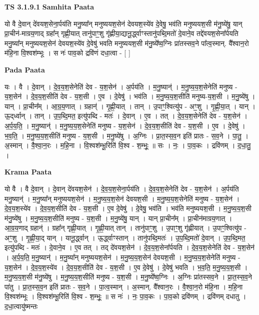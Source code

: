 \documentclass[17pt]{extarticle}
\begin{document}
\textbf{TS 3.1.9.1 } \newline
\textbf{Samhita Paata} \newline

यो वै दे॒वान् दे॑वयश॒सेना॒र्पय॑ति मनु॒ष्या᳚न् मनुष्ययश॒सेन॑ देवयश॒स्ये॑व दे॒वेषु॒ भव॑ति मनुष्ययश॒सी म॑नु॒ष्ये॑षु॒ यान् प्रा॒चीन॑-माग्रय॒णाद् ग्रहा᳚न् गृह्णी॒यात् तानु॑पाꣳ॒॒शु गृ॑ह्णीया॒द्यानू॒र्द्ध्वाꣳस्तानु॑पब्दि॒मतो॑ दे॒वाने॒व तद्दे॑वयश॒सेना᳚र्पयति मनु॒ष्या᳚न् मनुष्ययश॒सेन॑ देवयश॒स्ये॑व दे॒वेषु॑ भवति मनुष्ययश॒सी म॑नु॒ष्ये᳚ष्व॒ग्निः प्रा॑तस्सव॒ने पा᳚त्व॒स्मान्. वै᳚श्वान॒रो म॑हि॒ना वि॒श्वश॑म्भूः । स नः॑ पाव॒को द्रवि॑णं दधा॒त्वा - [  ] \newline

\textbf{Pada Paata} \newline

यः । वै । दे॒वान् । दे॒व॒य॒श॒सेनेति॑ देव - य॒श॒सेन॑ । अ॒र्पय॑ति । म॒नु॒ष्यान्॑ । म॒नु॒ष्य॒य॒श॒सेनेति॑ मनुष्य - य॒श॒सेन॑ । दे॒व॒य॒श॒सीति॑ देव - य॒श॒सी । ए॒व । दे॒वेषु॑ । भव॑ति । म॒नु॒ष्य॒य॒श॒सीति॑ मनुष्य-य॒श॒सी । म॒नु॒ष्ये॑षु । यान् । प्रा॒चीन᳚म् । आ॒ग्र॒य॒णात् । ग्रहान्॑ । गृ॒ह्णी॒यात् । तान् । उ॒पाꣳ॒॒श्वित्यु॑प - अꣳ॒॒शु । गृ॒ह्णी॒या॒त् । यान् । ऊ॒द्‌र्ध्वान् । तान् । उ॒प॒ब्दि॒मत॒ इत्यु॑पब्दि - मतः॑ । दे॒वान् । ए॒व । तत् । दे॒व॒य॒श॒सेनेति॑ देव - य॒श॒सेन॑ । अ॒र्प॒य॒ति॒ । म॒नु॒ष्यान्॑ । म॒नु॒ष्य॒य॒श॒सेनेति॑ मनुष्य - य॒श॒सेन॑ । दे॒व॒य॒श॒सीति॑ देव - य॒श॒सी । ए॒व । दे॒वेषु॑ । भ॒व॒ति॒ । म॒नु॒ष्य॒य॒श॒सीति॑ मनुष्य - य॒श॒सी । म॒नु॒ष्ये॑षु । अ॒ग्निः । प्रा॒त॒स्स॒व॒न इति॑ प्रातः - स॒व॒ने । पा॒तु॒ ।अ॒स्मान् । वै॒श्वा॒न॒रः । म॒हि॒ना । वि॒श्वश॑म्भू॒रिति॑ वि॒श्व - श॒म्भूः॒ ॥ सः । नः॒ । पा॒व॒कः । द्रवि॑णम् । द॒धा॒तु॒ ।  \newline


\textbf{Krama Paata} \newline

यो वै । वै दे॒वान् । दे॒वान् दे॑वयश॒सेन॑ । दे॒व॒य॒श॒सेना॒र्पय॑ति । दे॒व॒य॒श॒सेनेति॑ देव - य॒श॒सेन॑ । अ॒र्पय॑ति मनु॒ष्यान्॑ । म॒नु॒ष्या᳚न् मनुष्ययश॒सेन॑ । म॒नु॒ष्य॒य॒श॒सेन॑ देवयश॒सी । म॒नु॒ष्य॒य॒श॒सेनेति॑ मनुष्य - य॒श॒सेन॑ । दे॒व॒य॒श॒स्ये॑व । दे॒व॒य॒श॒सीति॑ देव - य॒श॒सी । ए॒व दे॒वेषु॑ । दे॒वेषु॒ भव॑ति । भव॑ति मनुष्ययश॒सी । म॒नु॒ष्य॒य॒श॒सी म॑नु॒ष्ये॑षु । म॒नु॒ष्य॒य॒श॒सीति॑ मनुष्य - य॒श॒सी । म॒नु॒ष्ये॑षु॒ यान् । यान् प्रा॒चीन᳚म् । प्रा॒चीन॑माग्रय॒णात् । आ॒ग्र॒य॒णाद् ग्रहान्॑ । ग्रहा᳚न् गृह्णी॒यात् । गृ॒ह्णी॒यात् तान् । तानु॑पाꣳ॒॒शु । उ॒पाꣳ॒॒शु गृ॑ह्णीयात् । उ॒पाꣳ॒॒श्वित्यु॑प - अꣳ॒॒शु । गृ॒ह्णी॒या॒द् यान् । यानू॒र्द्ध्वान् । ऊ॒र्द्ध्वाꣳस्तान् । तानु॑पब्दि॒मतः॑ । उ॒प॒ब्दि॒मतो॑ दे॒वान् । उ॒प॒ब्दि॒मत॒ इत्यु॑पब्दि - मतः॑ । दे॒वाने॒व । ए॒व तत् । तद् दे॑वयश॒सेन॑ । दे॒व॒य॒श॒सेना᳚र्पयति । दे॒व॒य॒श॒सेनेति॑ देव - य॒श॒सेन॑ । अ॒र्प॒य॒ति॒ म॒नु॒ष्यान्॑ । म॒नु॒ष्या᳚न् मनुष्ययश॒सेन॑ । म॒नु॒ष्य॒य॒श॒सेन॑ देवयश॒सी । म॒नु॒ष्य॒य॒श॒सेनेति॑ मनुष्य - य॒श॒सेन॑ । दे॒व॒य॒श॒स्ये॑व । दे॒व॒य॒श॒सीति॑ देव - य॒श॒सी । ए॒व दे॒वेषु॑ । दे॒वेषु॑ भवति । भ॒व॒ति॒ म॒नु॒ष्य॒य॒श॒सी । म॒नु॒ष्य॒य॒श॒सी म॑नु॒ष्ये॑षु । म॒नु॒ष्य॒य॒श॒सीति॑ मनुष्य - य॒श॒सी । म॒नु॒ष्ये᳚ष्व॒ग्निः । अ॒ग्निः प्रा॑तस्सव॒ने । प्रा॒त॒स्स॒व॒ने पा॑तु । प्रा॒त॒स्स॒व॒न इति॑ प्रातः - स॒व॒ने । पा॒त्व॒स्मान् । अ॒स्मान्. वै᳚श्वान॒रः । वै॒श्वा॒न॒रो म॑हि॒ना । म॒हि॒ना वि॒श्वश॑म्भूः । वि॒श्वश॑म्भू॒रिति॑ वि॒श्व - श॒म्भूः॒ ॥ स नः॑ । नः॒ पा॒व॒कः । पा॒व॒को द्रवि॑णम् । द्रवि॑णम् दधातु । द॒धा॒त्वायु॑ष्मन्तः \newline
\end{document}
